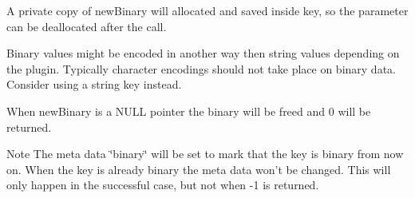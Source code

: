A private copy of {\ttfamily new\-Binary} will allocated and saved inside {\ttfamily key}, so the parameter can be deallocated after the call.

Binary values might be encoded in another way then string values depending on the plugin. Typically character encodings should not take place on binary data. Consider using a string key instead.

When new\-Binary is a N\-U\-L\-L pointer the binary will be freed and 0 will be returned.

\begin{DoxyNote}{Note}
The meta data \char`\"{}binary\char`\"{} will be set to mark that the key is binary from now on. When the key is already binary the meta data won't be changed. This will only happen in the successful case, but not when -\/1 is returned.
\end{DoxyNote}

